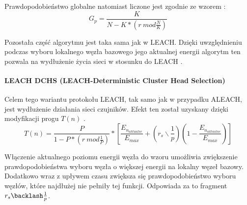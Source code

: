 Prawdopodobieństwo globalne natomiast liczone jest zgodnie ze wzorem \cite{Ali2008}:
\[
	G_{p} = \frac{K}{N - K * (r \:mod \frac{N}{K})}
\]

Pozostała część algorytmu jest taka sama jak w LEACH. Dzięki uwzględnieniu podczas wyboru lokalnego węzła bazowego jego aktualnej energii algorytm ten pozwala na wydłużenie życia sieci w stosunku do LEACH \cite{Singh2017}.
\paragraph{LEACH DCHS (LEACH-Deterministic Cluster Head Selection)}
Celem tego wariantu protokołu LEACH, tak samo jak w przypadku ALEACH, jest wydłużenie działania sieci czujników. Efekt ten został uzyskany dzięki modyfikacji progu $T(n)$ \cite{Handy2002, Singh2017}.
 \[
	T(n) =  \frac{P}{1 - P * (r \:mod \frac{1}{P})} * \left[\frac{E_{n_{aktualne}}}{E_{max}} + \left(r_{s} \backslash \frac{1}{p}\right)\left(1 - \frac{E_{n_{aktualne}}}{E_{max}}\right)\right]
\]

Włączenie aktualnego poziomu energii węzła do wzoru umożliwia zwiększenie prawdopodobieństwa wyboru węzła o większej energii na lokalny węzeł bazowy. Dodatkowo wraz z upływem czasu zwiększa się prawdopodobieństwo wyboru węzłów, które najdłużej nie pełniły tej funkcji. Odpowiada za to fragment $r_{s} \backlash \frac{1}{p}$.